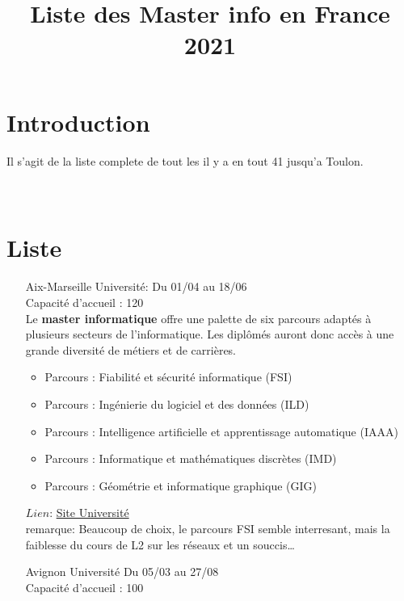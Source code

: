 \documentclass[a4paper,11pt]{article}
\title{\color{OrangeHaf} \Huge Liste des Master info en France\\2021}
\date{}
\newcommand{\e}{\'{e}}
\begin{document}
\pagecolor{BlackHaf}
    \maketitle
    \section{Introduction}
        Il s'agit de la liste complete de tout les il y a en tout 41 jusqu'a Toulon.
        \\
        \\
        \\
    \section{Liste}
    \begin{enumerate}
        \item [\color{LightOrangeHaf} Aix-Marseille Université:] Du 01/04 au 18/06 
                \\Capacité d'accueil : 120
                \\ Le \textbf{master informatique} offre une palette de six parcours adaptés à plusieurs secteurs de l'informatique. Les diplômés auront donc accès à une grande diversité de métiers et de carrières.
                \begin{itemize}
                    \item Parcours : Fiabilité et sécurité informatique (FSI)
                    \item Parcours : Ingénierie du logiciel et des données (ILD)
                    \item Parcours : Intelligence artificielle et apprentissage automatique (IAAA)
                    \item Parcours : Informatique et mathématiques discrètes (IMD)
                    \item Parcours : Géométrie et informatique graphique (GIG)
                \end{itemize}
                $Lien$: \href{https://informatique-sciences.univ-amu.fr/master-informatique}{Site Université}\\
                remarque: Beaucoup de choix, le parcours FSI semble interresant, mais la faiblesse du cours de L2 sur les r\e seaux et un souccis\dots
\\
        \item [\color{LightOrangeHaf} Avignon Université] Du 05/03 au 27/08 
                \\Capacité d'accueil : 100

\end{enumerate}
\end{document}
